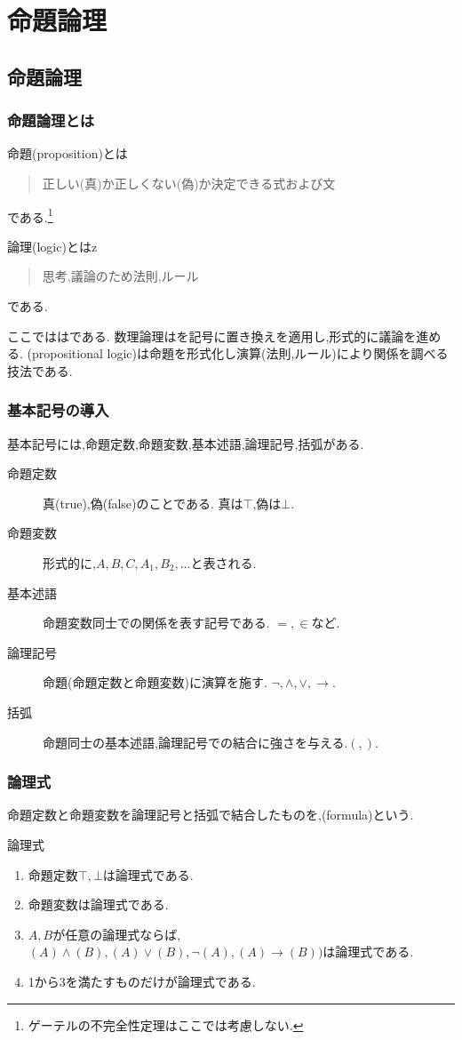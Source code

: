 \chapter{命題論理}
\section{命題論理}
\subsection{命題論理とは}
命題(proposition)とは
\begin{quotation}
 正しい(真)か正しくない(偽)か決定できる式および文
\end{quotation}
である.\footnote{ゲーテルの不完全性定理はここでは考慮しない.}

論理(logic)とはz
\begin{quotation}
 思考,議論のため法則,ルール
\end{quotation}
である.

ここでははである.
数理論理はを記号に置き換えを適用し,形式的に議論を進める.
(propositional logic)は命題を形式化し演算(法則,ルール)により関係を調べる技法である.

\subsection{基本記号の導入}
基本記号には,命題定数,命題変数,基本述語,論理記号,括弧がある.
\begin{description}
 \item[命題定数] 真(true),偽(false)のことである. 真は$\top$,偽は$\bot$.
 \item[命題変数] 形式的に,$A,B,C,A_1,B_2,...$と表される.
 \item[基本述語] 命題変数同士での関係を表す記号である. $=,\in$など.
 \item[論理記号] 命題(命題定数と命題変数)に演算を施す. $\lnot,\land,\lor,\to$.
 \item[括弧] 命題同士の基本述語,論理記号での結合に強さを与える.$(,)$.
\end{description}
\newpage

\subsection{論理式}
命題定数と命題変数を論理記号と括弧で結合したものを,(formula)という.
\begin{dfn}
 論理式
 \begin{enumerate}
  \item 命題定数$\top,\bot$は論理式である.
  \item 命題変数は論理式である.
  \item $A,B$が任意の論理式ならば,$(A) \land (B),(A) \lor (B), \lnot (A), (A) \to (B))$は論理式である.
  \item 1から3を満たすものだけが論理式である.
 \end{enumerate}
\end{dfn}

